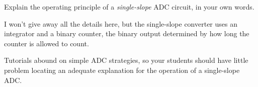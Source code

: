 

Explain the operating principle of a {\it single-slope} ADC circuit, in your own words.







I won't give away all the details here, but the single-slope converter uses an integrator and a binary counter, the binary output determined by how long the counter is allowed to count.







Tutorials abound on simple ADC strategies, so your students should have little problem locating an adequate explanation for the operation of a single-slope ADC.




